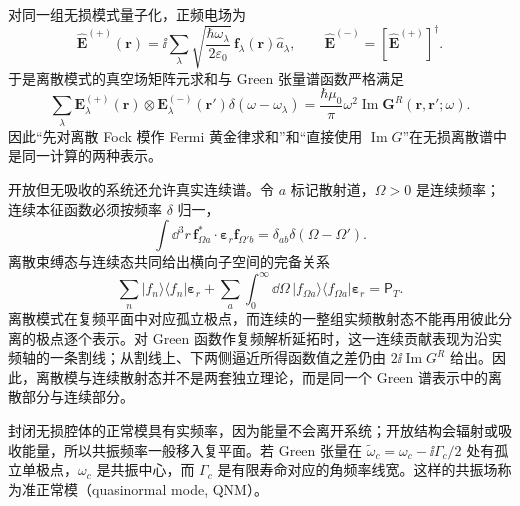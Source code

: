 对同一组无损模式量子化，正频电场为
\begin{equation}
\hat{\mathbf E}^{(+)}(\mathbf r)
=\ii\sum_\lambda
\sqrt{\frac{\hbar\omega_\lambda}{2\varepsilon_0}}
\,\mathbf f_\lambda(\mathbf r)\hat a_\lambda,
\qquad
\hat{\mathbf E}^{(-)}=[\hat{\mathbf E}^{(+)}]^\dagger .
\label{eq:lossless_quantized_electric_mode_expansion}
\end{equation}
于是离散模式的真空场矩阵元求和与 Green 张量谱函数严格满足
\begin{equation}
\boxed{
\sum_\lambda
\mathbf E_\lambda^{(+)}(\mathbf r)\otimes
\mathbf E_\lambda^{(-)}(\mathbf r')
\delta(\omega-\omega_\lambda)
=\frac{\hbar\mu_0}{\pi}\omega^2
\operatorname{Im}\mathbf G^R(\mathbf r,\mathbf r';\omega).}
\label{eq:lossless_mode_sum_to_green_fdt_zeroT}
\end{equation}
因此“先对离散 Fock 模作 Fermi 黄金律求和”和“直接使用 $\operatorname{Im}G$”在无损离散谱中是同一计算的两种表示。

开放但无吸收的系统还允许真实连续谱。令 $a$ 标记散射道，$\Omega>0$ 是连续频率；连续本征函数必须按频率 $\delta$ 归一，
\begin{equation}
\boxed{
\int\dd^3 r\,
\mathbf f_{\Omega a}^*\cdot\boldsymbol\varepsilon_r\mathbf f_{\Omega' b}
=\delta_{ab}\delta(\Omega-\Omega').}
\label{eq:maxwell_continuum_delta_frequency_normalization}
\end{equation}
离散束缚态与连续态共同给出横向子空间的完备关系
\begin{equation}
\boxed{
\sum_n|f_n\rangle\langle f_n|\boldsymbol\varepsilon_r
+\sum_a\int_0^\infty\dd\Omega\,
|f_{\Omega a}\rangle\langle f_{\Omega a}|\boldsymbol\varepsilon_r
=\mathsf P_T.}
\label{eq:maxwell_discrete_continuum_completeness}
\end{equation}
离散模式在复频平面中对应孤立极点，而连续的一整组实频散射态不能再用彼此分离的极点逐个表示。对 Green 函数作复频解析延拓时，这一连续贡献表现为沿实频轴的一条割线；从割线上、下两侧逼近所得函数值之差仍由 $2\ii\operatorname{Im}G^R$ 给出。因此，离散模与连续散射态并不是两套独立理论，而是同一个 Green 谱表示中的离散部分与连续部分。

封闭无损腔体的正常模具有实频率，因为能量不会离开系统；开放结构会辐射或吸收能量，所以共振频率一般移入复平面。若 Green 张量在 $\widetilde\omega_c=\omega_c-\ii\Gamma_c/2$ 处有孤立单极点，$\omega_c$ 是共振中心，而 $\Gamma_c$ 是有限寿命对应的角频率线宽。这样的共振场称为准正常模（quasinormal mode, QNM）。

